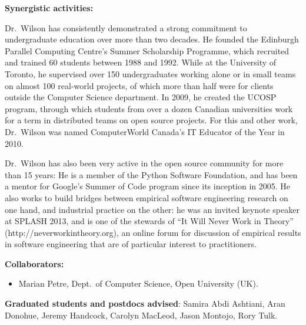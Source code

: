 \documentclass{proposalnsf}
\newlength{\up}
\begin{document}
\pagebreak

\textbf{Synergistic activities:} %

Dr.\ Wilson has consistently demonstrated a strong commitment to undergraduate education over more than two decades.
He founded the Edinburgh Parallel Computing Centre's Summer Scholarship Programme,
which recruited and trained 60 students between 1988 and 1992.
While at the University of Toronto,
he supervised over 150 undergraduates working alone or in small teams on almost 100 real-world projects,
of which more than half were for clients outside the Computer Science department.
In 2009, he created the UCOSP program,
through which students from over a dozen Canadian universities work for a term in distributed teams on open source projects.
For this and other work,
Dr.\ Wilson was named ComputerWorld Canada's IT Educator of the Year in 2010.

Dr.\ Wilson has also been very active in the open source community for more than 15 years:
He is a member of the Python Software Foundation,
and has been a mentor for Google's Summer of Code program since its inception in 2005.
He also works to build bridges between empirical software engineering research on one hand,
and industrial practice on the other:
he was an invited keynote speaker at SPLASH 2013,
and is one of the stewards of ``It Will Never Work in Theory'' (http://neverworkintheory.org),
an online forum for discussion of empirical results in software engineering
that are of particular interest to practitioners.

\textbf{Collaborators:} %
\vspace{\up}

\begin{itemize}
\item Marian Petre, Dept.\ of Computer Science, Open University (UK).
\end{itemize}

\textbf{Graduated students and postdocs advised}: Samira Abdi Ashtiani, Aran Donohue, Jeremy Handcock, Carolyn MacLeod, Jason Montojo, Rory Tulk.
\end{document}
